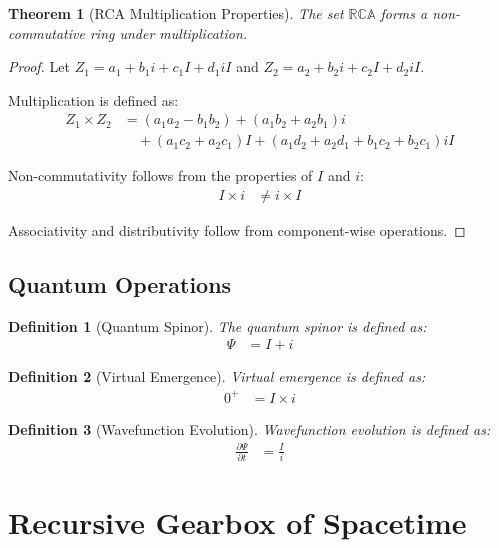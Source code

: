 \documentclass[12pt,a4paper]{article}
\newtheorem{definition}{Definition}
\newtheorem{theorem}{Theorem}
\begin{document}
\begin{theorem}[RCA Multiplication Properties]
The set $\mathbb{RCA}$ forms a non-commutative ring under multiplication.
\end{theorem}

\begin{proof}
Let $Z_1 = a_1 + b_1i + c_1I + d_1iI$ and $Z_2 = a_2 + b_2i + c_2I + d_2iI$.

Multiplication is defined as:
\begin{align}
Z_1 \times Z_2 &= (a_1a_2 - b_1b_2) + (a_1b_2 + a_2b_1)i \\
&\quad + (a_1c_2 + a_2c_1)I + (a_1d_2 + a_2d_1 + b_1c_2 + b_2c_1)iI
\end{align}

Non-commutativity follows from the properties of $I$ and $i$:
\begin{align}
I \times i &\neq i \times I
\end{align}

Associativity and distributivity follow from component-wise operations.
\end{proof}

\subsection{Quantum Operations}

\begin{definition}[Quantum Spinor]
The quantum spinor is defined as:
\begin{align}
\Psi &= I + i
\end{align}
\end{definition}

\begin{definition}[Virtual Emergence]
Virtual emergence is defined as:
\begin{align}
0^+ &= I \times i
\end{align}
\end{definition}

\begin{definition}[Wavefunction Evolution]
Wavefunction evolution is defined as:
\begin{align}
\frac{\partial \Psi}{\partial t} &= \frac{I}{i}
\end{align}
\end{definition}

\section{Recursive Gearbox of Spacetime}
\end{document}
